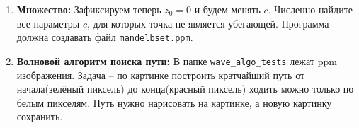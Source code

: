 \documentclass{article}
\begin{document}
\begin{enumerate}
\item \textbf{Множество:} Зафиксируем теперь $z_0 = 0$ и будем менять $c$. Численно найдите все параметры $c$, для которых точка не является убегающей. Программа должна создавать файл \texttt{mandelbset.ppm}.


\item \textbf{Волновой алгоритм поиска пути:} В папке \texttt{wave\_algo\_tests} лежат ppm изображения. Задача -- по картинке построить кратчайший путь от начала(зелёный пиксель) до конца(красный пиксель) ходить можно только по белым пикселям. Путь нужно нарисовать на картинке, а новую картинку сохранить.
\end{enumerate}
\end{document}
